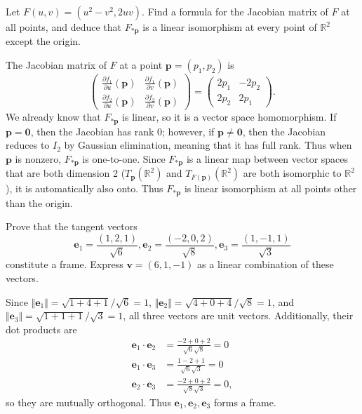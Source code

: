 \documentclass[10pt]{report}
\begin{document}

\begin{exer}[1.7: 4]
	Let $F(u,v) = (u^2-v^2, 2uv)$. Find a formula for the Jacobian matrix of $F$ at all points, and deduce that $F_{*\mathbf{p}}$ is a linear isomorphism at every point of $\mathbb{R}^2$ except the origin.
\end{exer}
The Jacobian matrix of $F$ at a point $\mathbf{p}=(p_1, p_2)$ is
\[
\begin{pmatrix}
	\frac{\partial f_1}{\partial u}(\mathbf{p}) & \frac{\partial f_1}{\partial v} (\mathbf{p})\\[6pt]
	\frac{\partial f_2}{\partial u} (\mathbf{p})& \frac{\partial f_2}{\partial v} (\mathbf{p})
\end{pmatrix} =
\begin{pmatrix}
	2p_1 & -2p_2 \\
	2p_2 & 2p_1
\end{pmatrix}.
\] We already know that $F_{*\mathbf{p}}$ is linear, so it is a vector space homomorphism. If $\mathbf{p}=\mathbf{0}$, then the Jacobian has rank 0; however, if $\mathbf{p} \neq \mathbf{0}$, then the Jacobian reduces to $I_2$ by Gaussian elimination, meaning that it has full rank. Thus when $\mathbf{p}$ is nonzero, $F_{*\mathbf{p}}$ is one-to-one. Since $F_{*\mathbf{p}}$ is a linear map between vector spaces that are both dimension 2 ($T_{\mathbf{p}}(\mathbb{R}^2)$ and $T_{F(\mathbf{p})}(\mathbb{R}^2)$ are both isomorphic to $\mathbb{R}^2$), it is automatically also onto. Thus $F_{*\mathbf{p}}$ is linear isomorphism at all points other than the origin.

\begin{exer}[2.1: 3]
Prove that the tangent vectors
\[
	\mathbf{e}_1 = \frac{(1,2,1)}{\sqrt{6} }, \mathbf{e}_2=\frac{(-2,0,2)}{\sqrt{8} }, \mathbf{e}_3=\frac{(1,-1,1)}{\sqrt{3} } 
\] constitute a frame. Express $\mathbf{v}=(6,1,-1)$ as a linear combination of these vectors.
\end{exer}
Since $\Vert{\mathbf{e}_1}\Vert = \sqrt{1+4+1} /\sqrt{6} =1$, $\Vert{\mathbf{e}_2}\Vert=\sqrt{4+0+4} /\sqrt{8} =1$, and $\Vert{\mathbf{e}_3}\Vert=\sqrt{1+1+1} /\sqrt{3} =1$, all three vectors are unit vectors. Additionally, their dot products are
\begin{align*}
	\mathbf{e}_1\cdot \mathbf{e}_2 &= \frac{-2+0+2}{\sqrt{6} \sqrt{8} } =0 \\
	\mathbf{e}_1 \cdot \mathbf{e}_3 &= \frac{1-2+1}{\sqrt{6} \sqrt{3} } =0 \\
	\mathbf{e}_2 \cdot \mathbf{e}_3 &= \frac{-2+0+2}{\sqrt{8} \sqrt{3} } =0,
\end{align*}
so they are mutually orthogonal. Thus $\mathbf{e}_1, \mathbf{e}_2, \mathbf{e}_3$ forms a frame.
\end{document}
